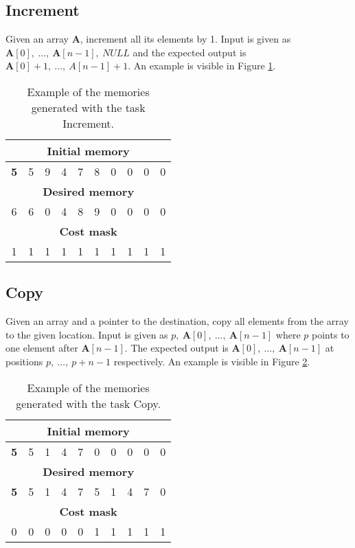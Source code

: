 \subsection{Increment}
Given an array $\textbf{A}$, increment all its elements by 1. Input is given as $\textbf{A}[0],\ \dots,\ \textbf{A}[n-1],\ \textit{NULL}$ and the expected output is $\textbf{A}[0] + 1,\ \dots,\ A[n-1] + 1$. An example is visible in Figure \ref{fig:increment-example}.
\begin{table}[h!]
	\centering
	\begin{tabular}{|c|c|c|c|c|c|c|c|c|c|}
		\hline
		\multicolumn{10}{|c|}{\textbf{Initial memory}} \\ \hline
		\textbf{5} & 5 & 9 & 4 & 7 & 8 & 0 & 0 & 0 & 0 \\ \hline\hline\hline
		\multicolumn{10}{|c|}{\textbf{Desired memory}} \\ \hline
		6 & 6 & 0 & 4 & 8 & 9 & 0 & 0 & 0 & 0 \\ \hline\hline\hline
		\multicolumn{10}{|c|}{\textbf{Cost mask}} \\ \hline
		1 & 1 & 1 & 1 & 1 & 1 & 1 & 1 & 1 & 1 \\ \hline
	\end{tabular}
	\caption{Example of the memories generated with the task Increment.}
	\label{fig:increment-example}
\end{table}
\FloatBarrier
\subsection{Copy}
Given an array and a pointer to the destination, copy all elements from the array to the given location. Input is given as $p,\ \textbf{A}[0],\ \dots,\ \textbf{A}[n-1]$ where $p$ points to one element after $\textbf{A}[n-1]$. The expected output is $\textbf{A}[0],\ \dots,\ \textbf{A}[n-1]$ at positions $p,\ \dots,\ p+n-1$ respectively. An example is visible in Figure \ref{fig:copy-example}.
\begin{table}[h!]
	\centering
	\begin{tabular}{|c|c|c|c|c|c|c|c|c|c|}
		\hline
		\multicolumn{10}{|c|}{\textbf{Initial memory}} \\ \hline
		\textbf{5} & 5 & 1 & 4 & 7 & 0 & 0 & 0 & 0 & 0 \\ \hline\hline\hline
		\multicolumn{10}{|c|}{\textbf{Desired memory}} \\ \hline
		\textbf{5} & 5 & 1 & 4 & 7 & 5 & 1 & 4 & 7 & 0 \\ \hline\hline\hline
		\multicolumn{10}{|c|}{\textbf{Cost mask}} \\ \hline
		0 & 0 & 0 & 0 & 0 & 1 & 1 & 1 & 1 & 1 \\ \hline
	\end{tabular}
	\caption{Example of the memories generated with the task Copy.}
	\label{fig:copy-example}
\end{table}
\FloatBarrier
